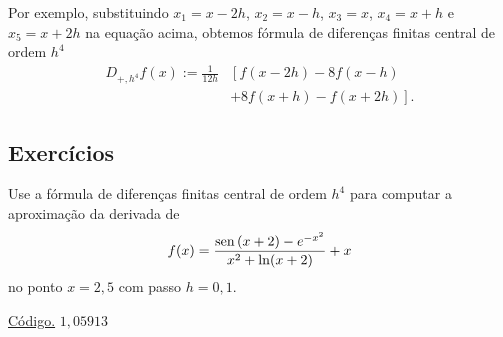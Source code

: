 Por exemplo, substituindo $x_1=x-2h$, $x_2=x-h$, $x_3=x$, $x_4=x+h$ e $x_5=x+2h$ na equação acima, obtemos fórmula de diferenças finitas central de ordem $h^4$
\begin{align}
  D_{+,h^4}f(x) := \frac{1}{12h} &\left[f{\left (x - 2 h\right )} - 8 f{\left(x - h \right )} \right. \\
  &+ \left. 8 f{\left (x + h \right )} - f{\left (x + 2 h \right )}\right].
\end{align}

\subsection*{Exercícios}

\begin{exer}\label{exer:dfch4_fun}
  Use a fórmula de diferenças finitas central de ordem $h^4$ para computar a aproximação da derivada de
  \begin{equation}
    f(x) = \frac{\operatorname{sen}\,(x+2) - e^{-x^2}}{x^2 + \ln(x+2)}+x
  \end{equation}
no ponto $x=2,5$ com passo $h=0,1$.
\end{exer}
\begin{resp}
  \ifisoctave 
  \href{https://github.com/phkonzen/notas/blob/master/src/MatematicaNumerica/cap_deriv/dados/exer_dfch4_fun/exer_dfch4_fun.m}{Código.} 
  \fi
  $1,05913$
\end{resp}

